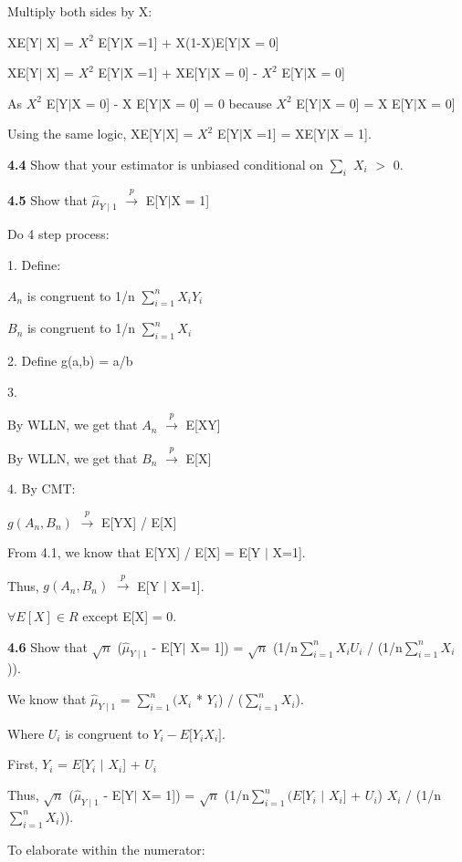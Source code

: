 Multiply both sides by X:

XE[Y$\mid$ X] = $X^{2}$ E[Y$\mid$X =1] + X(1-X)E[Y$\mid$X = 0]

XE[Y$\mid$ X] = $X^{2}$ E[Y$\mid$X =1] + XE[Y$\mid$X = 0] - $X^{2}$ E[Y$\mid$X = 0]

As $X^{2}$ E[Y$\mid$X = 0] - X E[Y$\mid$X = 0] = 0 because 
$X^{2}$ E[Y$\mid$X = 0] = X E[Y$\mid$X = 0]

Using the same logic, XE[Y$\mid$X] = $X^{2}$ E[Y$\mid$X =1] = XE[Y$\mid$X = 1].

\textbf{4.4}
Show that your estimator is unbiased conditional on $\sum_{i}$ $X_{i}$ $>$ 0.

\textbf{4.5} Show that $\hat{\mu}_{Y\mid1}$ $\xrightarrow{p}$ E[Y$\mid$X = 1]

Do 4 step process:

1.
Define:

$A_{n}$ is congruent to 1/n $\sum^n_{i=1} X_{i}Y_{i}$

$B_{n}$ is congruent to 1/n $\sum^n_{i=1} X_{i}$

2. Define g(a,b) = a/b

3. 

By WLLN, we get that $A_{n}$ $\xrightarrow{p}$ E[XY]

By WLLN, we get that $B_{n}$ $\xrightarrow{p}$ E[X]

4. By CMT:

$g(A_{n}, B_{n})$ $\xrightarrow{p}$ E[YX] / E[X] 

From 4.1, we know that E[YX] / E[X] = E[Y $\mid$ X=1].

Thus, $g(A_{n}, B_{n})$ $\xrightarrow{p}$ E[Y $\mid$ X=1].

$\forall E[X] \in R$ except E[X] = 0.

\textbf{4.6} Show that $\sqrt{n}$ ($\hat{\mu}_{Y\mid1}$ - E[Y$\mid$ X= 1]) = $\sqrt{n}$ (1/n$\sum^n_{i=1} X_{i}U_{i}$ / (1/n$\sum^n_{i=1} X_{i}$)).

We know that 
$\hat{\mu}_{Y\mid1}$ = $\sum^n_{i=1} (X_{i}$ * $Y_{i}$) / ($\sum^n_{i=1} X_{i}$).

Where $U_{i}$ is congruent to $Y_{i} - E[Y_{i} $\mid$ X_{i}]$.

First, 
$Y_{i}$ = $E[Y_{i}$ $\mid$ $X_{i}$] + $U_{i}$

Thus,
$\sqrt{n}$ ($\hat{\mu}_{Y\mid1}$ - E[Y$\mid$ X= 1]) = $\sqrt{n}$ (1/n$\sum^n_{i=1} (E[Y_{i} $ $\mid$ $X_{i}]$ + $U_{i}$) $X_{i}$ / (1/n$\sum^n_{i=1} X_{i}$)).

To elaborate within the numerator:

